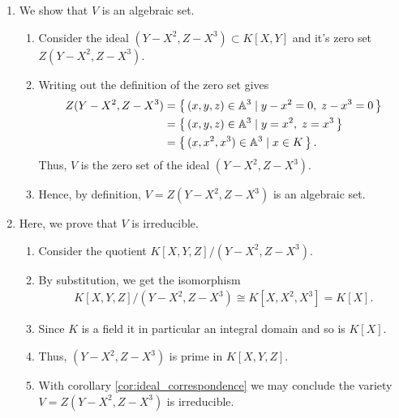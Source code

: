 \begin{solution}
    \begin{enumerate}
        \item We show that \(V\) is an algebraic set.
        \begin{enumerate}
            \item Consider the ideal \((Y - X^2, Z - X^3) \subset K[X, Y]\) and it's zero set \(Z(Y - X^2, Z - X^3)\).
            \item Writing out the definition of the zero set gives
            \begin{align*}
                Z(Y - X^2, Z - X^3) &= \left\{\, (x, y, z) \in \mathbb{A}^3 \mathrel{\mid} y - x^2 = 0, \; z - x^3 = 0 \,\right\} \\
                &= \left\{\, (x, y, z) \in \mathbb{A}^3 \mathrel{\mid} y = x^2, \; z = x^3 \,\right\} \\
                &= \left\{\, (x, x^2, x^3) \in \mathbb{A}^3 \mathrel{\mid} x \in K \,\right\} \text{.}
            \end{align*}
            Thus, \(V\) is the zero set of the ideal \((Y - X^2, Z - X^3)\).
            \item Hence, by definition, \(V = Z(Y - X^2, Z - X^3)\) is an algebraic set.
        \end{enumerate}
        \item Here, we prove that \(V\) is irreducible.
        \begin{enumerate}
            \item Consider the quotient \(K[X, Y, Z] / (Y - X^2, Z - X^3)\).
            \item By substitution, we get the isomorphism
            \begin{align*}
                K[X, Y, Z] / (Y - X^2, Z - X^3) \cong K[X, X^2, X^3] = K[X] \text{.}
            \end{align*}
            \item Since \(K\) is a field it in particular an integral domain and so is \(K[X]\).
            \item Thus, \((Y - X^2, Z - X^3)\) is prime in \(K[X, Y, Z]\).
            \item With corollary \ref{cor:ideal_correspondence} we may conclude the variety \(V = Z(Y - X^2, Z - X^3)\) is irreducible.
        \end{enumerate}
    \end{enumerate}
\end{solution}


